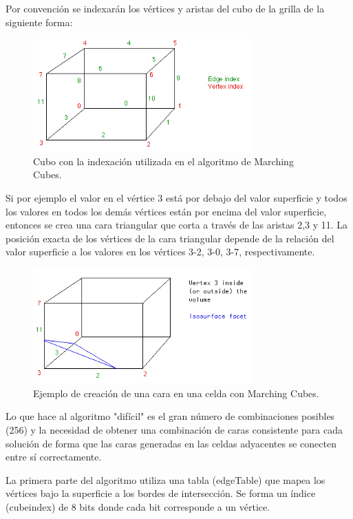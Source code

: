 \documentclass[12pt]{article}
\begin{document}
Por convención se indexarán los vértices y aristas del cubo de la grilla de la siguiente forma:
\begin{figure}[h!]
\includegraphics[width=0.75\textwidth,center]{marchingcubes1.png}
\caption{Cubo con la indexación utilizada en el algoritmo de Marching Cubes.}
\end{figure}

Si por ejemplo el valor en el vértice 3 está por debajo del valor superficie y todos los valores en todos los demás vértices están por encima del valor superficie, entonces se crea una cara triangular que corta a través de las aristas 2,3 y 11. La posición exacta de los vértices de la cara triangular depende de la relación del valor superficie a los valores en los vértices 3-2, 3-0, 3-7, respectivamente.
\begin{figure}[h!]
\includegraphics[width=0.75\textwidth,center]{marchingcubes2.png}
\caption{Ejemplo de creación de una cara en una celda con Marching Cubes.}
\end{figure}
Lo que hace al algoritmo "difícil" es el gran número de combinaciones posibles (256) y la necesidad de obtener una combinación de caras consistente para cada solución de forma que las caras generadas en las celdas adyacentes se conecten entre sí correctamente.

La primera parte del algoritmo utiliza una tabla (edgeTable) que mapea los vértices bajo la superficie a los bordes de intersección. Se forma un índice (cubeindex) de 8 bits donde cada bit corresponde a un vértice.
\lstset{language=C}          %
\end{document}
